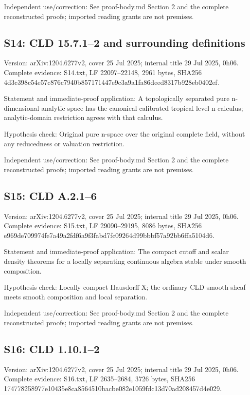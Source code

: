 \documentclass[11pt]{article}
\begin{document}
Independent use/correction: See proof-body.md Section 2 and the complete reconstructed proofs; imported reading grants are not premises.

\subsection{S14: CLD 15.7.1--2 and surrounding definitions}

Version: arXiv:1204.6277v2, cover 25 Jul 2025; internal title 29 Jul 2025, 0h06. Complete evidence: S14.txt, LF 22097--22148, 2961 bytes, SHA256 4d3c398c54e57c876c7940b857171447e9c3a9a1fa86deed8317b928eb0402ef.

Statement and immediate-proof application: A topologically separated pure n-dimensional analytic space has the canonical calibrated tropical level-n calculus; analytic-domain restriction agrees with that calculus.

Hypothesis check: Original pure n-space over the original complete field, without any reducedness or valuation restriction.

Independent use/correction: See proof-body.md Section 2 and the complete reconstructed proofs; imported reading grants are not premises.

\subsection{S15: CLD A.2.1--6}

Version: arXiv:1204.6277v2, cover 25 Jul 2025; internal title 29 Jul 2025, 0h06. Complete evidence: S15.txt, LF 29090--29195, 8086 bytes, SHA256 e969de709974fe7a49a2fdf6a9f3fabd7fc09264d99bbbf57a92bb6ffa5104d6.

Statement and immediate-proof application: The compact cutoff and scalar density theorems for a locally separating continuous algebra stable under smooth composition.

Hypothesis check: Locally compact Hausdorff X; the ordinary CLD smooth sheaf meets smooth composition and local separation.

Independent use/correction: See proof-body.md Section 2 and the complete reconstructed proofs; imported reading grants are not premises.

\subsection{S16: CLD 1.10.1--2}

Version: arXiv:1204.6277v2, cover 25 Jul 2025; internal title 29 Jul 2025, 0h06. Complete evidence: S16.txt, LF 2635--2684, 3726 bytes, SHA256 174778258977e10435e8ca8564510bacbe082e1059fdc13d70ad208457d4e029.
\end{document}
